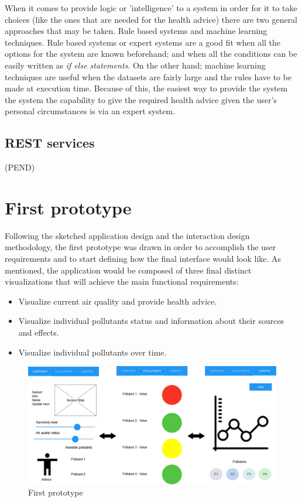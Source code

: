 When it comes to provide logic or 'intelligence' to a system in order for it to take choices (like the ones that are needed for the health advice) there are two general approaches that may be taken. Rule based systems and machine learning techniques. Rule based systems or expert systems are a good fit when all the options for the system are known beforehand; and when all the conditions can be easily written as \textit{if else statements}. On the other hand; machine learning techniques are useful when the datasets are fairly large and the rules have to be made at execution time. Because of this, the easiest way to provide the system the system the capability to give the required health advice given the user's personal circumstances is via an expert system.

\subsection{REST services}
(PEND)

\section{First prototype}
Following the sketched application design and the interaction design methodology, the first prototype was drawn in order to accomplish the user requirements and to start defining how the final interface would look like. As mentioned, the application would be composed of three final distinct visualizations that will achieve the main functional requirements:

\begin{itemize}
	\item Visualize current air quality and provide health advice.
    \item Visualize individual pollutants status and information about their sources and effects.
    \item Visualize individual pollutants over time.
\end{itemize}


\begin{figure}[H]
\begin{adjustbox}{width=1.2\textwidth,center=\textwidth}
  \centering
  \includegraphics[scale=1]{images/firstPrototype.png}
\end{adjustbox}
  \caption[Frist prototype]{First prototype}
  \label{fig:first_visualization_first_prototype}
\end{figure}



